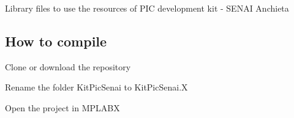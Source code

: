 Library files to use the resources of P\+IC development kit -\/ S\+E\+N\+AI Anchieta

\subsection*{How to compile}


\begin{DoxyEnumerate}
\item Clone or download the repository
\item Rename the folder Kit\+Pic\+Senai to Kit\+Pic\+Senai.\+X
\item Open the project in M\+P\+L\+A\+BX 
\end{DoxyEnumerate}